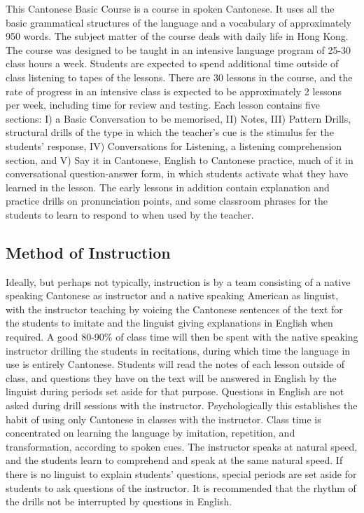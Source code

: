 This Cantonese Basic Course is a course in spoken Cantonese. It uses all the basic grammatical structures of the language and a vocabulary of approximately 950 words. The subject matter of the course deals with daily life in Hong Kong. The course was designed to be taught in an intensive language program of 25-30 class hours a week. Students are expected to spend additional time outside of class listening to tapes of the lessons. There are 30 lessons in the course, and the rate of progress in an intensive class is expected to be approximately 2 lessons per week, including time for review and testing. Each lesson contains five sections: I) a Basic Conversation to be memorised, II) Notes, III) Pattern Drills, structural drills of the type in which the teacher's cue is the stimulus fer the students' response, IV) Conversations for Listening, a listening comprehension section, and V) Say it in Cantonese, English to Cantonese practice, much of it in conversational question-answer form, in which students activate what they have learned in the lesson. The early lessons in addition contain explanation and practice drills on pronunciation points, and some classroom phrases for the students to learn to respond to when used by the teacher.


\subsection{Method of Instruction}

Ideally, but perhaps not typically, instruction is by a team consisting of a native speaking Cantonese as instructor and a native speaking American as linguist, with the instructor teaching by voicing the Cantonese sentences of the text for the students to imitate and the linguist giving explanations in English when required. A good 80-90\% of class time will then be spent with the native speaking instructor drilling the students in recitations, during which time the language in use is entirely Cantonese. Students will read the notes of each lesson outside of class, and questions they have on the text will be answered in English by the linguist during periods set aside for that purpose. Questions in English are not asked during drill sessions with the instructor. Psychologically this establishes the habit of using only Cantonese in classes with the instructor. Class time is concentrated on learning the language by imitation, repetition, and transformation, according to spoken cues. The instructor speaks at natural speed, and the students learn to comprehend and speak at the same natural speed. If there is no linguist to explain students' questions, special periods are set aside for students to ask questions of the instructor. It is recommended that the rhythm of the drills not be interrupted by questions in English.

